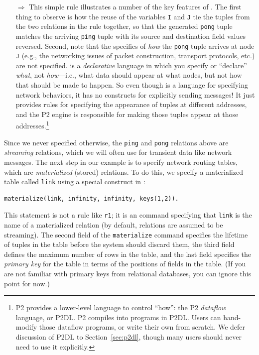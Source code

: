 \documentclass{article}
\begin{document}
\begin{itemize}
\item[$\Longrightarrow$] This simple rule illustrates a number of the
  key features of \ol.  The first thing to observe is how the reuse
  of the variables \lstinline$I$ and \lstinline$J$ tie the tuples from
  the two relations in the rule together, so that the generated
  \lstinline$pong$ tuple matches the arriving \lstinline$ping$ tuple
  with its source and destination field values reversed.  Second, note
  that the specifics of {\em how} the \lstinline$pong$ tuple arrives at
  node \lstinline$J$ (e.g., the networking issues of packet construction,
  transport protocols, etc.)  are not specified.  \ol is a {\em
  declarative} language in which you specify or ``declare'' {\em what},
  not {\em how}---i.e., what data should appear at what nodes, but not
  how that should be made to happen.  So even though \ol is a
  language for specifying network behaviors, it has no constructs for
  explicitly sending messages!  It just provides rules for specifying
  the appearance of tuples at different addresses, and the P2 engine is
  responsible for making those tuples appear at those
  addresses.\footnote{P2 provides a lower-level language to control
  ``how'': the P2 {\em dataflow} language, or P2DL.  P2 compiles \ol
  into programs in P2DL. Users can hand-modify those dataflow programs,
  or write their own from scratch.  We defer discussion of P2DL to
  Section~\ref{sec:p2dl}, though many users should never need to use it
  explicitly.}
\end{itemize}


\noindent
Since we never specified otherwise, the \lstinline$ping$ and
\lstinline$pong$ relations above are {\em streaming} relations, which
we will often use for transient data like network messages.  The next
step in our example is to specify network routing tables, which are
{\em materialized} (stored) relations.  To do this, we specify a
materialized table called \lstinline$link$ using a special construct
in \ol:

\begin{lstlisting}
materialize(link, infinity, infinity, keys(1,2)).
\end{lstlisting}
This \ol statement is not a rule like \lstinline$r1$; it is an
\ol command specifying that \lstinline$link$ is the name of a
materialized relation (by default, relations are assumed to be
streaming).  The second field of the \lstinline$materialize$ command
specifies the lifetime of tuples in the table before the system should
discard them, the third field
defines the maximum number of rows in the table,
and the last field specifies the {\em primary key} for
the table in terms of the positions of fields in the table.  (If you
are not familiar with primary keys from relational databases, you can
ignore this point for now.)
\end{document}
